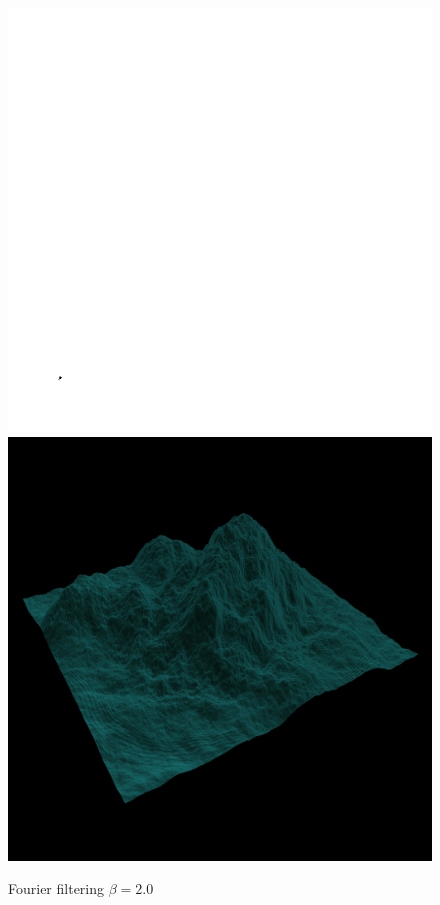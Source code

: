 	\begin{figure}[H]
	  \centering
	  \includegraphics[width=\imagewidth]{images/results/terrains/512-1/fourier/20}
	  \includegraphics[width=\imagewidth]{images/results/terrains/512-1/fourier/20_3d}
	  \caption{Fourier filtering $\beta = 2.0$}
	  \label{fig:ex-fourier20-surface}
	\end{figure}
	
